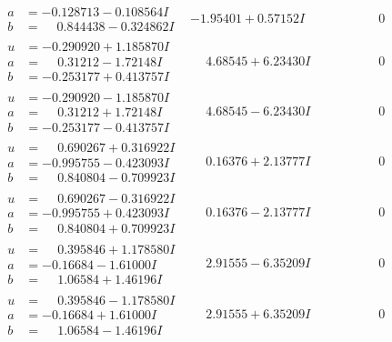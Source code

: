 \documentclass[1p]{elsarticle_modified}
\theoremstyle{definition}
\begin{document}
$$\begin{array}{c|c|c}
\begin{aligned}
a &= -0.128713 - 0.108564 I \\
b &= \phantom{-}0.844438 - 0.324862 I\end{aligned}
 & -1.95401 + 0.57152 I & \phantom{-0.000000 } 0 \\ \hline\begin{aligned}
u &= -0.290920 + 1.185870 I \\
a &= \phantom{-}0.31212 - 1.72148 I \\
b &= -0.253177 + 0.413757 I\end{aligned}
 & \phantom{-}4.68545 + 6.23430 I & \phantom{-0.000000 } 0 \\ \hline\begin{aligned}
u &= -0.290920 - 1.185870 I \\
a &= \phantom{-}0.31212 + 1.72148 I \\
b &= -0.253177 - 0.413757 I\end{aligned}
 & \phantom{-}4.68545 - 6.23430 I & \phantom{-0.000000 } 0 \\ \hline\begin{aligned}
u &= \phantom{-}0.690267 + 0.316922 I \\
a &= -0.995755 - 0.423093 I \\
b &= \phantom{-}0.840804 - 0.709923 I\end{aligned}
 & \phantom{-}0.16376 + 2.13777 I & \phantom{-0.000000 } 0 \\ \hline\begin{aligned}
u &= \phantom{-}0.690267 - 0.316922 I \\
a &= -0.995755 + 0.423093 I \\
b &= \phantom{-}0.840804 + 0.709923 I\end{aligned}
 & \phantom{-}0.16376 - 2.13777 I & \phantom{-0.000000 } 0 \\ \hline\begin{aligned}
u &= \phantom{-}0.395846 + 1.178580 I \\
a &= -0.16684 - 1.61000 I \\
b &= \phantom{-}1.06584 + 1.46196 I\end{aligned}
 & \phantom{-}2.91555 - 6.35209 I & \phantom{-0.000000 } 0 \\ \hline\begin{aligned}
u &= \phantom{-}0.395846 - 1.178580 I \\
a &= -0.16684 + 1.61000 I \\
b &= \phantom{-}1.06584 - 1.46196 I\end{aligned}
 & \phantom{-}2.91555 + 6.35209 I & \phantom{-0.000000 } 0\\

\end{array}$$
\end{document}
